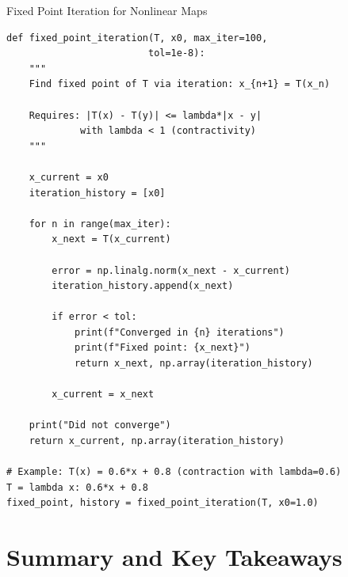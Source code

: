 \documentclass[aspectratio=169,10pt]{beamer}
\begin{document}
\begin{frame}[fragile]{Fixed Point Iteration for Nonlinear Maps}

\begin{lstlisting}
def fixed_point_iteration(T, x0, max_iter=100,
                         tol=1e-8):
    """
    Find fixed point of T via iteration: x_{n+1} = T(x_n)

    Requires: |T(x) - T(y)| <= lambda*|x - y|
             with lambda < 1 (contractivity)
    """

    x_current = x0
    iteration_history = [x0]

    for n in range(max_iter):
        x_next = T(x_current)

        error = np.linalg.norm(x_next - x_current)
        iteration_history.append(x_next)

        if error < tol:
            print(f"Converged in {n} iterations")
            print(f"Fixed point: {x_next}")
            return x_next, np.array(iteration_history)

        x_current = x_next

    print("Did not converge")
    return x_current, np.array(iteration_history)

# Example: T(x) = 0.6*x + 0.8 (contraction with lambda=0.6)
T = lambda x: 0.6*x + 0.8
fixed_point, history = fixed_point_iteration(T, x0=1.0)
\end{lstlisting}

\end{frame}


\section{Summary and Key Takeaways}
\end{document}
